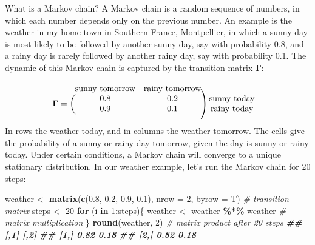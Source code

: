\documentclass[
  12pt,
]{krantz}
\newenvironment{Shaded}{\begin{snugshade}}{\end{snugshade}}
\newcommand{\AttributeTok}[1]{\textcolor[rgb]{0.13,0.29,0.53}{#1}}
\newcommand{\CommentTok}[1]{\textcolor[rgb]{0.56,0.35,0.01}{\textit{#1}}}
\newcommand{\ControlFlowTok}[1]{\textcolor[rgb]{0.13,0.29,0.53}{\textbf{#1}}}
\newcommand{\DecValTok}[1]{\textcolor[rgb]{0.00,0.00,0.81}{#1}}
\newcommand{\DocumentationTok}[1]{\textcolor[rgb]{0.56,0.35,0.01}{\textbf{\textit{#1}}}}
\newcommand{\FloatTok}[1]{\textcolor[rgb]{0.00,0.00,0.81}{#1}}
\newcommand{\FunctionTok}[1]{\textcolor[rgb]{0.13,0.29,0.53}{\textbf{#1}}}
\newcommand{\NormalTok}[1]{#1}
\newcommand{\OtherTok}[1]{\textcolor[rgb]{0.56,0.35,0.01}{#1}}
\newcommand{\SpecialCharTok}[1]{\textcolor[rgb]{0.81,0.36,0.00}{\textbf{#1}}}
\begin{document}
What is a Markov chain? A Markov chain is a random sequence of numbers, in which each number depends only on the previous number. An example is the weather in my home town in Southern France, Montpellier, in which a sunny day is most likely to be followed by another sunny day, say with probability 0.8, and a rainy day is rarely followed by another rainy day, say with probability 0.1. The dynamic of this Markov chain is captured by the transition matrix \(\mathbf{\Gamma}\):
\[
\begin{matrix}
& \\
\mathbf{\Gamma} = 
    \left ( \vphantom{ \begin{matrix} 12 \\ 12 \end{matrix} } \right .
\end{matrix}
\hspace{-1.2em}
\begin{matrix}
    \text{sunny tomorrow} & \text{rainy tomorrow} \\ 
0.8 & 0.2 \\ 
0.9 & 0.1 \\ 
\end{matrix}
\hspace{-0.2em}
\begin{matrix}
& \\
\left . \vphantom{ \begin{matrix} 12 \\ 12 \\ 12 \end{matrix} } \right )
    \begin{matrix}
    \text{sunny today} \\ \text{rainy today}
    \end{matrix}
\end{matrix}
\]
In rows the weather today, and in columns the weather tomorrow. The cells give the probability of a sunny or rainy day tomorrow, given the day is sunny or rainy today. Under certain conditions, a Markov chain will converge to a unique stationary distribution. In our weather example, let's run the Markov chain for 20 steps:

\begin{Shaded}
\begin{Highlighting}[]
\NormalTok{weather }\OtherTok{\textless{}{-}} \FunctionTok{matrix}\NormalTok{(}\FunctionTok{c}\NormalTok{(}\FloatTok{0.8}\NormalTok{, }\FloatTok{0.2}\NormalTok{, }\FloatTok{0.9}\NormalTok{, }\FloatTok{0.1}\NormalTok{), }\AttributeTok{nrow =} \DecValTok{2}\NormalTok{, }\AttributeTok{byrow =}\NormalTok{ T) }\CommentTok{\# transition matrix}
\NormalTok{steps }\OtherTok{\textless{}{-}} \DecValTok{20}
\ControlFlowTok{for}\NormalTok{ (i }\ControlFlowTok{in} \DecValTok{1}\SpecialCharTok{:}\NormalTok{steps)\{}
\NormalTok{  weather }\OtherTok{\textless{}{-}}\NormalTok{ weather }\SpecialCharTok{\%*\%}\NormalTok{ weather }\CommentTok{\# matrix multiplication}
\NormalTok{\}}
\FunctionTok{round}\NormalTok{(weather, }\DecValTok{2}\NormalTok{) }\CommentTok{\# matrix product after 20 steps}
\DocumentationTok{\#\#      [,1] [,2]}
\DocumentationTok{\#\# [1,] 0.82 0.18}
\DocumentationTok{\#\# [2,] 0.82 0.18}
\end{Highlighting}
\end{Shaded}
\end{document}
